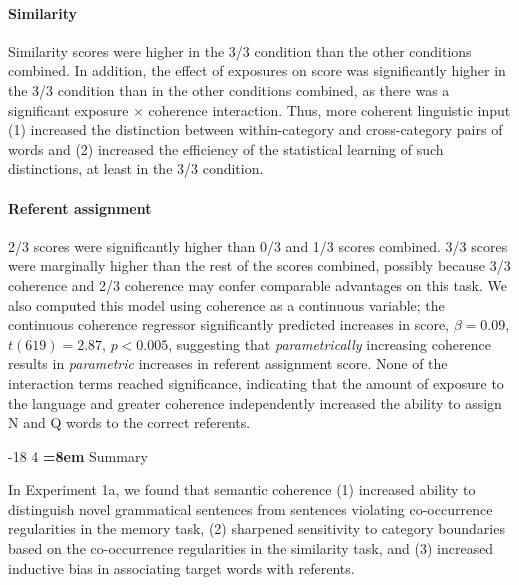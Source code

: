 \documentclass[man,longtable, floatmark]{my-apa6}
\makeatletter
\renewcommand\subsubsection{\@startsection{subsubsection}{3}{\z@}%
                       {-18\p@ \@plus -4\p@ \@minus -4\p@}%
                       {4\p@ \@plus 2\p@ \@minus 2\p@}%
                       {\normalfont\normalsize\bfseries\boldmath
                        \rightskip=\z@ \@plus 8em\pretolerance=10000 }}
\makeatother
\begin{document}
\paragraph{Similarity} Similarity scores were higher in the 3/3 condition than the other conditions combined. In addition, the effect of exposures on score was significantly higher in the 3/3 condition than in the other conditions combined, as there was a significant exposure $\times$ coherence interaction. Thus, more coherent linguistic input (1) increased the distinction between within-category and cross-category pairs of words and (2) increased the efficiency of the statistical learning of such distinctions, at least in the 3/3 condition.

\paragraph{Referent assignment}

2/3 scores were significantly higher than 0/3 and 1/3 scores combined. 3/3 scores were marginally higher than the rest of the scores combined, possibly because 3/3 coherence and 2/3 coherence may confer comparable advantages on this task. We also computed this model using coherence as a continuous variable; the continuous coherence regressor significantly predicted increases in score, $\beta = 0.09$, $t(619) = 2.87$, $p < 0.005$, suggesting that \emph{parametrically} increasing coherence results in \emph{parametric} increases in referent assignment score. None of the interaction terms reached significance, indicating that the amount of exposure to the language and greater coherence independently increased the ability to assign N and Q words to the correct referents.


\subsubsection{Summary}

In Experiment 1a, we found that semantic coherence (1) increased ability to distinguish novel grammatical sentences from sentences violating co-occurrence regularities in the memory task, (2) sharpened sensitivity to category boundaries based on the co-occurrence regularities in the similarity task, and (3) increased inductive bias in associating target words with referents.
\end{document}

